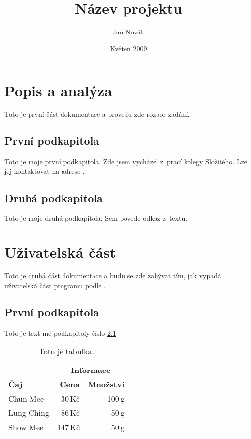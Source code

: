 \documentclass{article}
\title{Název projektu}
\author{Jan Novák}
\date{Květen 2009}
\begin{document}
\maketitle


\newpage
\section{Popis a analýza}
Toto je první část dokumentace a provedu zde rozbor zadání.

\subsection{První podkapitola}
Toto je moje první podkapitola.
Zde jsem vycházel z~prací kolegy Složitého. Lze jej kontaktovat 
na adrese .

\subsection{Druhá podkapitola}
Toto je moje druhá podkapitola. Sem povede odkaz z~textu.


\newpage
\section{Uživatelská část}
Toto je druhá část dokumentace a budu se zde zabývat tím, 
jak vypadá uživatelská část programu podle \cite{smith}.

\subsection{První podkapitola}\label{kapX}
Toto je text mé podkapitoly číslo \ref{kapX}

\begin{table}[ht]
  \begin{center}
    \renewcommand{\arraystretch}{1.2}
    \begin{tabular}{||l|rr||}
      \hline
      & \multicolumn{2}{|c||}{\bf \hbox{Informace}} \\
      \cline{2-3}
      \bf Čaj & \bf Cena & \bf Množství \\
      \hline
      Chun Mee & 30\,Kč & 100\,g \\
      Lung Ching & 86\,Kč & 50\,g \\
      Show Mee & 147\,Kč & 50\,g \\
      \hline
    \end{tabular}
    \caption{Toto je tabulka.} \label{tab}
  \end{center}
\end{table}
\end{document}
